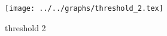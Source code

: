 \begin{figure}[h] \centering\texttt{[image: ../../graphs/threshold\_2.tex]}\caption{threshold 2}\label{gr:threshold_2} \end{figure}
